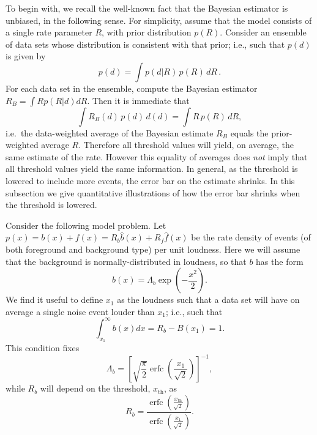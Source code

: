\documentclass[aps,prd,reprint,nofootinbib]{revtex4-1}
\DeclareMathOperator{\erfc}{erfc}
\begin{document}
To begin with, we recall the well-known fact that the Bayesian
estimator is unbiased, in the following sense.  For simplicity, assume
that the model consists of a single rate parameter $R$, with prior
distribution $p(R)$.  Consider an ensemble of data sets whose
distribution is consistent with that prior; i.e., such that $p(d)$ is
given by
\begin{equation}
 p(d) = \int{ p(d|R)\,p(R)\, dR}\, .  
\end{equation}
For each data set in the ensemble, compute the Bayesian estimator
$R_{B} = \int{ R p(R|d) dR}$.  Then it is immediate that
\begin{equation}
\int{R_{B}(d)\, p(d)\,d(d) }= \int{ R\, p(R) \,dR},
\end{equation}
i.e.\ the data-weighted average of the Bayesian estimate $R_{B}$
equals the prior-weighted average $R$.  Therefore all threshold values
will yield, on average, the same estimate of the rate.  However this
equality of averages does {\it not} imply that all threshold values
yield the same information. In general, as the threshold is lowered to
include more events, the error bar on the estimate shrinks.  In this
subsection we give quantitative illustrations of how the error bar
shrinks when the threshold is lowered.

Consider the following model problem.  Let $p(x) = b(x) + f(x) = R_b
\hat{b}(x) + R_f \hat{f}(x)$ be the rate density of events (of both
foreground and background type) per unit loudness.  Here we will
assume that the background is normally-distributed in loudness, so
that $b$ has the form
\begin{equation}
b(x) = \Lambda_b \exp \left(- \frac{x^2}{2} \right).
\end{equation}
We find it useful to define $x_1$ as the loudness such that a data set
will have on average a single noise event louder than $x_1$; i.e.,
such that 
\begin{equation}
 \int_{x_1}^{\infty} b(x) dx = R_b - B\left(x_1\right) = 1.
\end{equation}
This condition fixes 
\begin{equation}
  \Lambda_b = \left[ \sqrt{\frac{\pi}{2}} \erfc\left(
    \frac{x_1}{\sqrt{2}} \right) \right]^{-1},
\end{equation}
while $R_b$ will depend on the threshold, $x_\mathrm{th}$, as 
\begin{equation}
  R_b = \frac{\erfc\left( \frac{x_\mathrm{th}}{\sqrt{2}}
    \right)}{\erfc\left( \frac{x_1}{\sqrt{2}} \right)}.
\end{equation}
\end{document}
